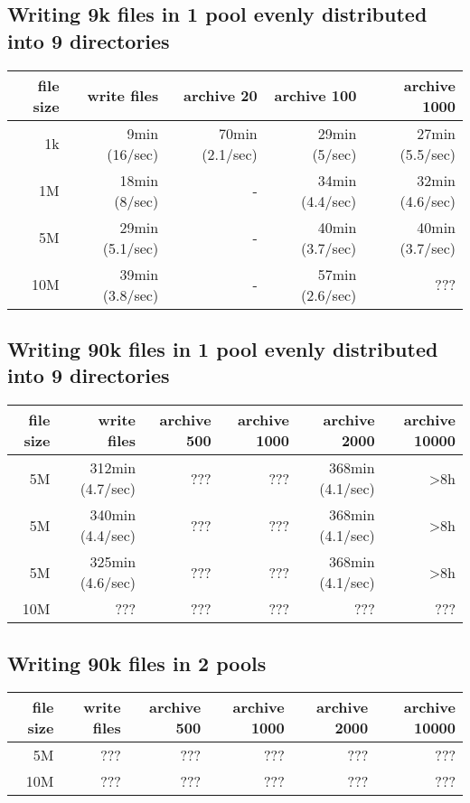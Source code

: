 \documentclass[a4paper,8pt]{scrartcl}
\begin{document}
\subsection{Writing 9k files in 1 pool evenly distributed into 9 directories}

\begin{tabular}{|r||r||r|r|r|}
  \hline
  file size & write files  & archive 20 & archive 100 & archive 1000 \\
  \hline
  1k        &  9min (16/sec)  & 70min (2.1/sec) & 29min (5/sec) & 27min (5.5/sec) \\
  \hline
  1M        & 18min (8/sec)   &        -        & 34min (4.4/sec) & 32min (4.6/sec) \\
  \hline
  5M        & 29min (5.1/sec) &        -        & 40min (3.7/sec) & 40min (3.7/sec) \\
  \hline
  10M       & 39min (3.8/sec) &        -        & 57min (2.6/sec) & ??? \\
  \hline
\end{tabular}

\subsection{Writing 90k files in 1 pool evenly distributed into 9 directories}

\begin{tabular}{|r||r||r|r|r|r|}
  \hline
  file size & write files  & archive 500 & archive 1000 & archive 2000 & archive 10000 \\
  \hline
  5M        & 312min (4.7/sec) & ??? & ??? & 368min (4.1/sec) & >8h \\
  5M        & 340min (4.4/sec) & ??? & ??? & 368min (4.1/sec) & >8h \\
  5M        & 325min (4.6/sec) & ??? & ??? & 368min (4.1/sec) & >8h \\
  \hline
  10M       & ??? & ??? & ??? & ??? & ??? \\
  \hline
\end{tabular}

\subsection{Writing 90k files in 2 pools}

\begin{tabular}{|r||r||r|r|r|r|}
  \hline
  file size & write files  & archive 500 & archive 1000 & archive 2000 & archive 10000 \\
  \hline
  5M        & ??? & ??? & ??? & ??? & ??? \\
  \hline
  10M       & ??? & ??? & ??? & ??? & ??? \\
  \hline
\end{tabular}
\end{document}
